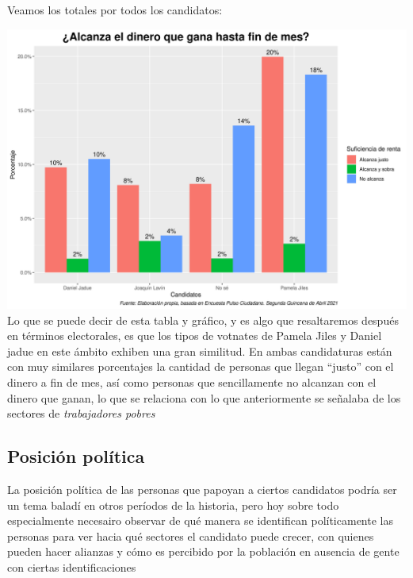 \documentclass[
]{article}
\begin{document}
Veamos los totales por todos los candidatos:

\includegraphics{MoniPlot.png} Lo que se puede decir de esta tabla y
gráfico, y es algo que resaltaremos después en términos electorales, es
que los tipos de votnates de Pamela Jiles y Daniel jadue en este ámbito
exhiben una gran similitud. En ambas candidaturas están con muy
similares porcentajes la cantidad de personas que llegan ``justo'' con
el dinero a fin de mes, así como personas que sencillamente no alcanzan
con el dinero que ganan, lo que se relaciona con lo que anteriormente se
señalaba de los sectores de \emph{trabajadores pobres}

\hypertarget{posiciuxf3n-poluxedtica}{%
\subsection{\texorpdfstring{\textbf{Posición
política}}{Posición política}}\label{posiciuxf3n-poluxedtica}}

La posición política de las personas que papoyan a ciertos candidatos
podría ser un tema baladí en otros períodos de la historia, pero hoy
sobre todo especialmente necesairo observar de qué manera se identifican
políticamente las personas para ver hacia qué sectores el candidato
puede crecer, con quienes pueden hacer alianzas y cómo es percibido por
la población en ausencia de gente con ciertas identificaciones

\newline
\end{document}
